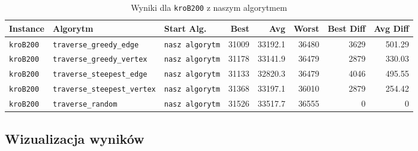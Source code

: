 \documentclass[11pt]{article}
\begin{document}
\begin{table}[ht]
\centering
\begin{tabular}{|l|l|l|r|r|r|r|r|}
\hline
\textbf{Instance} & \textbf{Algorytm} & \textbf{Start Alg.} & \textbf{Best} & \textbf{Avg} & \textbf{Worst} & \textbf{Best Diff} & \textbf{Avg Diff} \\
\hline
\texttt{kroB200} & \texttt{traverse\_greedy\_edge} & \texttt{nasz algorytm} & 31009 & 33192.1 & 36480 & 3629 & 501.29 \\
\texttt{kroB200} & \texttt{traverse\_greedy\_vertex} & \texttt{nasz algorytm} & 31178 & 33141.9 & 36479 & 2879 & 330.03 \\
\texttt{kroB200} & \texttt{traverse\_steepest\_edge} & \texttt{nasz algorytm} & 31133 & 32820.3 & 36479 & 4046 & 495.55 \\
\texttt{kroB200} & \texttt{traverse\_steepest\_vertex} & \texttt{nasz algorytm} & 31368 & 33197.1 & 36010 & 2879 & 254.42 \\
\texttt{kroB200} & \texttt{traverse\_random} & \texttt{nasz algorytm} & 31526 & 33517.7 & 36555 & 0 & 0 \\
\hline
\end{tabular}
\caption{Wyniki dla \texttt{kroB200} z naszym algorytmem}\label{tab:table4}
\end{table}



\subsection{Wizualizacja wyników}\label{subsec:wizualizacja-wynikow}
\end{document}
